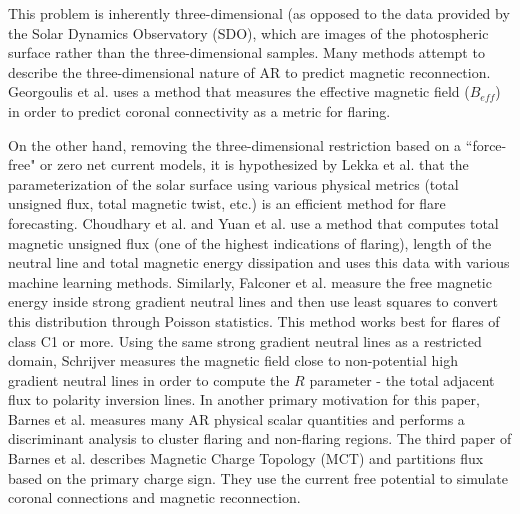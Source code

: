 \documentclass[defaultstyle,11pt]{thesis}
\begin{document}
This problem is inherently three-dimensional (as opposed to the data provided by the Solar Dynamics Observatory (SDO), which are images of the photospheric surface rather than the three-dimensional samples. Many methods attempt to describe the three-dimensional nature of AR to predict magnetic reconnection. Georgoulis et al. \cite{georgoulis_rust_2007} uses a method that measures the effective magnetic field ($B_{eff}$) in order to predict coronal connectivity as a metric for flaring.

On the other hand, removing the three-dimensional restriction based on a ``force-free" or zero net current models, it is hypothesized by Lekka et al. \cite{Properties1} that the parameterization of the solar surface using various physical metrics (total unsigned flux, total magnetic twist, etc.) is an efficient method for flare forecasting. Choudhary et al. \cite{choudhary_strassmeier_2011} and Yuan et al. \cite{yuan_shih_jing_wang_2010} use a method that computes total magnetic unsigned flux (one of the highest indications of flaring), length of the neutral line and total magnetic energy dissipation and uses this data with various machine learning methods. Similarly, Falconer et al. \cite{falconer_moore_gary_2008} measure the free magnetic energy inside strong gradient neutral lines and then use least squares to convert this distribution through Poisson statistics. This method works best for flares of class C1 or more. Using the same strong gradient neutral lines as a restricted domain, Schrijver \cite{schrijver} measures the magnetic field close to non-potential high gradient neutral lines in order to compute the $R$ parameter - the total adjacent flux to polarity inversion lines. In another primary motivation for this paper, Barnes et al. \cite{Properties1} measures many AR physical scalar quantities and performs a discriminant analysis to cluster flaring and non-flaring regions. The third paper of Barnes et al. \cite{Properties3} describes Magnetic Charge Topology (MCT) and partitions flux based on the primary charge sign. They use the current free potential to simulate coronal connections and magnetic reconnection.
\end{document}
